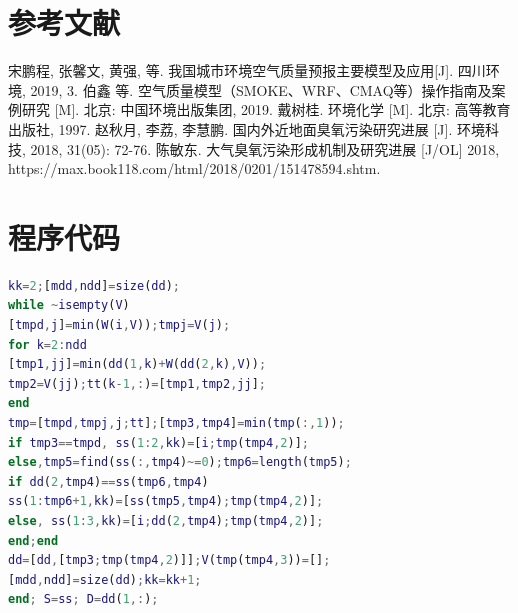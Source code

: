 \documentclass[bwprint]{gmcmthesis}
\numberwithin{figure}{section}
\begin{document}






%

\section{参考文献}
\begin{thebibliography}{1.2}%
\setlength{\itemsep}{-2mm}
 宋鹏程, 张馨文, 黄强, 等. 我国城市环境空气质量预报主要模型及应用[J]. 四川环境, 2019, 3.
 伯鑫 等. 空气质量模型（SMOKE、WRF、CMAQ等）操作指南及案例研究 [M]. 北京: 中国环境出版集团, 2019.
 戴树桂. 环境化学 [M]. 北京: 高等教育出版社, 1997.
 赵秋月, 李荔, 李慧鹏. 国内外近地面臭氧污染研究进展 [J]. 环境科技, 2018, 31(05): 72-76.
 陈敏东. 大气臭氧污染形成机制及研究进展 [J/OL] 2018, https://max.book118.com/html/2018/0201/151478594.shtm. 
\end{thebibliography}

\newpage
\appendix
\section{程序代码}
\begin{lstlisting}[language=Matlab] 
kk=2;[mdd,ndd]=size(dd);
while ~isempty(V)
[tmpd,j]=min(W(i,V));tmpj=V(j);
for k=2:ndd
[tmp1,jj]=min(dd(1,k)+W(dd(2,k),V));
tmp2=V(jj);tt(k-1,:)=[tmp1,tmp2,jj];
end
tmp=[tmpd,tmpj,j;tt];[tmp3,tmp4]=min(tmp(:,1));
if tmp3==tmpd, ss(1:2,kk)=[i;tmp(tmp4,2)];
else,tmp5=find(ss(:,tmp4)~=0);tmp6=length(tmp5);
if dd(2,tmp4)==ss(tmp6,tmp4)
ss(1:tmp6+1,kk)=[ss(tmp5,tmp4);tmp(tmp4,2)];
else, ss(1:3,kk)=[i;dd(2,tmp4);tmp(tmp4,2)];
end;end
dd=[dd,[tmp3;tmp(tmp4,2)]];V(tmp(tmp4,3))=[];
[mdd,ndd]=size(dd);kk=kk+1;
end; S=ss; D=dd(1,:);
 \end{lstlisting}
\end{document}
